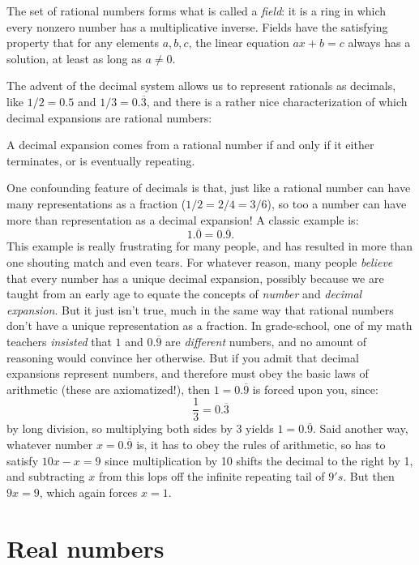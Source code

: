 \documentclass[11pt,oneside]{amsart}
\begin{document}
The set of rational numbers forms what is called a {\em field}: it is a ring in which every nonzero number has a multiplicative inverse.
Fields have the satisfying property that for any elements $a,b,c$, the linear equation $ax+b=c$ always has a solution, at least as long
as $a\neq 0$.

The advent of the decimal system allows us to represent rationals as decimals, like $1/2 = 0.5$ and $1/3 = 0.\overline{3}$,
and there is a rather nice characterization of which decimal expansions are rational numbers: 

\begin{proposition}\label{rat}
	A decimal expansion comes from a rational number if and only if it either terminates, or is eventually repeating.
\end{proposition}

One confounding feature of decimals is that, just like a rational number can have many representations as a fraction ($1/2 = 2/4 = 3/6$),
so too a number can have more than representation as a decimal expansion!  A classic example is:
$$
  1.\overline{0} = 0.\overline{9}.
$$ 
This example is really frustrating for many people, and has resulted in more than one shouting match and even tears. 
For whatever reason, many people {\em believe} that every number has a unique decimal expansion, possibly because
we are taught from an early age to equate the concepts of {\em number} and {\em decimal expansion}.  But it just isn't true,
much in the same way that rational numbers don't have a unique representation as a fraction.  In grade-school, one of my math teachers
{\em insisted} that $1$ and $0.\overline{9}$ are {\em different} numbers, and no amount of reasoning would convince her otherwise.  But if you
admit that decimal expansions represent numbers, and therefore must obey the basic laws of arithmetic (these are axiomatized!), then
$1=0.\overline{9}$ is forced upon you, since:
$$
\frac{1}{3} = 0.\overline{3}
$$
by long division, so multiplying both sides by 3 yields $1=0.\overline{9}$.  Said another way, whatever number $x=0.\overline{9}$
is, it has to obey the rules of arithmetic, so has to satisfy $10x - x = 9$ since multiplication by 10 shifts the decimal to the right by 1, 
and subtracting $x$ from this lops off the infinite repeating tail of $9's$.  But then $9x=9$, which again forces $x=1$.

\section{Real numbers}
\end{document}
